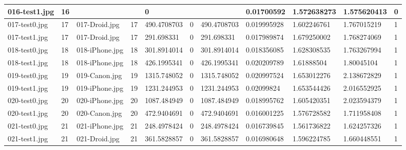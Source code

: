 \begin{landscape}
\begin{longtable}{|p{2cm}|p{1cm}|p{2cm}|p{1cm}|p{2cm}|p{1cm}|p{2cm}|p{2cm}|p{2cm}|p{2cm}|p{1cm}|}
	\hline
	016-test1.jpg & 16       &                &                      & 0             &                  &                     & 0.01700592    & 1.572638273   & 1.575620413       & 0         \\ 
	\hline
	017-test0.jpg & 17       & 017-Droid.jpg  & 17                   & 490.4708703   & 0                & 490.4708703         & 0.019995928   & 1.602246761   & 1.767015219       & 1         \\ 
	\hline
	017-test1.jpg & 17       & 017-Droid.jpg  & 17                   & 291.698331    & 0                & 291.698331          & 0.017989874   & 1.679250002   & 1.768274069       & 1         \\ 
	\hline
	018-test0.jpg & 18       & 018-iPhone.jpg & 18                   & 301.8914014   & 0                & 301.8914014         & 0.018356085   & 1.628308535   & 1.763267994       & 1         \\ 
	\hline
	018-test1.jpg & 18       & 018-iPhone.jpg & 18                   & 426.1995341   & 0                & 426.1995341         & 0.020209789   & 1.61888504    & 1.80045104        & 1         \\ 
	\hline
	019-test0.jpg & 19       & 019-Canon.jpg  & 19                   & 1315.748052   & 0                & 1315.748052         & 0.020997524   & 1.653012276   & 2.138672829       & 1         \\ 
	\hline
	019-test1.jpg & 19       & 019-iPhone.jpg & 19                   & 1231.244953   & 0                & 1231.244953         & 0.02099824    & 1.653544426   & 2.016552925       & 1         \\ 
	\hline
	020-test0.jpg & 20       & 020-iPhone.jpg & 20                   & 1087.484949   & 0                & 1087.484949         & 0.018995762   & 1.605420351   & 2.023594379       & 1         \\ 
	\hline
	020-test1.jpg & 20       & 020-Canon.jpg  & 20                   & 472.9404691   & 0                & 472.9404691         & 0.016001225   & 1.576728582   & 1.711958408       & 1         \\ 
	\hline
	021-test0.jpg & 21       & 021-iPhone.jpg & 21                   & 248.4978424   & 0                & 248.4978424         & 0.016739845   & 1.561736822   & 1.624257326       & 1         \\ 
	\hline
	021-test1.jpg & 21       & 021-Droid.jpg  & 21                   & 361.5828857   & 0                & 361.5828857         & 0.016980648   & 1.596224785   & 1.660448551       & 1         \\ 

\end{longtable}
\end{landscape}
